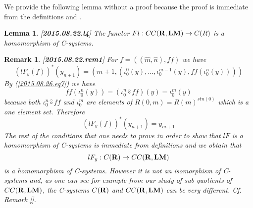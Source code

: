 \documentclass[11pt]{article}
\newtheorem{lemma}[proposition]{Lemma}
\newtheorem{remark}[proposition]{Remark}
\newcommand{\llabel}[1]{\label{#1}[{\bf #1}]}
\newcommand{\sr}{\rightarrow}
\newcommand{\rr}{{\bf R}}
\newcommand{\lm}{{\bf LM}}
\newcommand{\wh}{\widehat}
\newcommand{\hc}{\wh{\circ}}
\begin{document}
We provide the following lemma without a proof because the proof is immediate from the definitions and \cite[Lemma 3.4]{Cfromauniverse}. 
%
\begin{lemma}
\llabel{2015.08.22.l4}
The functor $Fl:CC(\rr,\lm)\sr C(R)$ is a homomorphism of C-systems.
\end{lemma}
%
\begin{remark}\rm
\llabel{2015.08.22.rem1} 
For $f=((\wh{m},\wh{n}),ff)$ we have
%
$$(lF_{y}(f))^*(y_{n+1})=(m+1,(\iota_0^0(y),\dots,\iota_0^{m-1}(y),ff(\iota_0^n(y))))$$
%
By (\ref{2015.08.26.eq7}) we have 
%
$$ff(\iota_0^n(y))=(\iota_0^n\hc ff)(y)=\iota_0^m(y)$$
%
because both $\iota_0^n\hc ff$ and $\iota_0^m$ are elements of $R(0,m)=R(m)^{stn(0)}$ which is a one element set. Therefore
%
$$(lF_{y}(f))^*(y_{n+1})=y_{m+1}$$
%
The rest of the conditions that one needs to prove in order to show that $lF$ is a homomorphism of C-systems is immediate from definitions and we obtain that 
%
$$lF_{y}:C(\rr)\sr CC(\rr,\lm)$$
%
is a homomorphism of C-systems.  However it is not an isomorphism of C-systems and, as one can see for example from our study of sub-quotients of $CC(\rr,\lm)$, the C-systems $C(\rr)$ and $CC(\rr,\lm)$ can be very different. Cf. Remark \ref{}. 
\end{remark}
%
\end{document}
